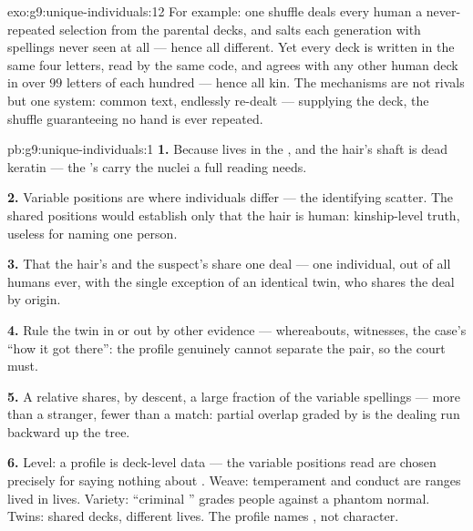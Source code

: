 \begin{solution}{exo:g9:unique-individuals:12}
For example: one shuffle deals every human a never-repeated
selection from the parental decks, and  salts each
generation with spellings never seen at all --- hence all
different. Yet every deck is written in the same four
letters, read by the same code, and agrees with any other
human deck in over $99$ letters of each hundred --- hence
all kin. The mechanisms are not rivals but one system:
common text, endlessly re-dealt ---  supplying the
deck, the shuffle guaranteeing no hand is ever repeated.
\end{solution}

\begin{solution}{pb:g9:unique-individuals:1}
\textbf{1.} Because  lives in the , and the
hair's shaft is dead keratin --- the 's  carry the
nuclei a full reading needs.

\textbf{2.} Variable positions are where individuals
differ --- the identifying scatter. The shared positions
would establish only that the hair is human: kinship-level
truth, useless for naming one person.

\textbf{3.} That the hair's  and the suspect's share
one deal --- one individual, out of all humans ever, with
the single exception of an identical twin, who shares the
deal by origin.

\textbf{4.} Rule the twin in or out by other evidence ---
whereabouts, witnesses, the case's ``how it got there'':
the profile genuinely cannot separate the pair, so the
court must.

\textbf{5.} A relative shares, by descent, a large
fraction of the variable spellings --- more than a
stranger, fewer than a match: partial overlap graded by
 is the dealing run backward up the tree.

\textbf{6.} Level: a profile is deck-level data --- the
variable positions read are chosen precisely for saying
nothing about . Weave: temperament and conduct are
ranges lived in lives. Variety: ``criminal '' grades
people against a phantom normal. Twins: shared decks,
different lives. The profile names , not character.


\end{solution}
